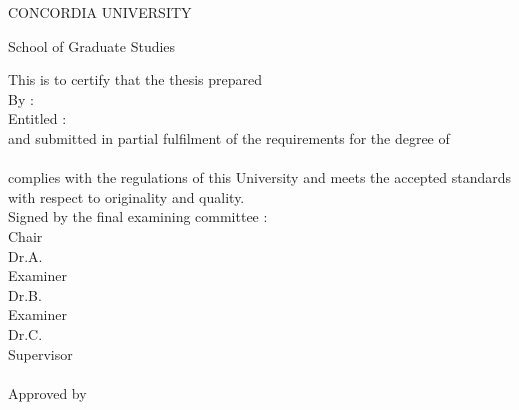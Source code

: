 \documentclass[11pt, a4paper, oneside]{Thesis} %
\begin{document}
\pagestyle{empty} %
  \vspace{1em}
     \begin{center}
        CONCORDIA UNIVERSITY
     \end{center}
     \begin{center}
        School of Graduate Studies
     \end{center}
     \vspace{3ex}
     This is to certify that the thesis prepared\\[2ex]
     By :\hspace{38pt}{\bf {\authornames}}\\[2ex]
     Entitled :\hspace*{13pt}{\bf \ttitle}\\[2ex] 
    and submitted in partial fulfilment of the requirements for the degree
    of\\[2ex]
    \hspace*{62pt}{\bf \degreename}\\[2ex]
    complies with the regulations of this University and meets the accepted
    standards with respect to originality and quality. \\[2ex]
    Signed by the final examining committee : \\[5ex]
    \hspace*{77pt}\underline{\hspace{234pt}} Chair\\
    \hspace*{77pt}Dr.\@ A. \\[2.5ex]
    \hspace*{77pt}\underline{\hspace{234pt}} Examiner\\
    \hspace*{77pt}Dr.\@ B. \\[2.5ex]
    \hspace*{77pt}\underline{\hspace{234pt}} Examiner\\
    \hspace*{77pt}Dr.\@ C. \\[2.5ex]
    \hspace*{77pt}\underline{\hspace{234pt}} Supervisor \\
    \hspace*{77pt}\@ \supname\\[2.5ex]
    Approved by \hspace{9pt}\underline{\hspace{232pt}}\\
\end{document}
